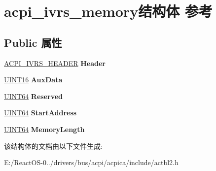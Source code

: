 \hypertarget{structacpi__ivrs__memory}{}\section{acpi\+\_\+ivrs\+\_\+memory结构体 参考}
\label{structacpi__ivrs__memory}
\subsection*{Public 属性}
\begin{DoxyCompactItemize}
\item 
\mbox{\label{structacpi__ivrs__memory_a1b237dfb0f6ebf34c266b7c51ddc71aa}} 
\hyperlink{structacpi__ivrs__header}{A\+C\+P\+I\+\_\+\+I\+V\+R\+S\+\_\+\+H\+E\+A\+D\+ER} {\bfseries Header}
\item 
\mbox{\label{structacpi__ivrs__memory_a574abda63edb2ae0896671077fc78d57}} 
\hyperlink{_processor_bind_8h_a09f1a1fb2293e33483cc8d44aefb1eb1}{U\+I\+N\+T16} {\bfseries Aux\+Data}
\item 
\mbox{\label{structacpi__ivrs__memory_a00f581d1b731ad64c4447fd057e21853}} 
\hyperlink{_processor_bind_8h_a57be03562867144161c1bfee95ca8f7c}{U\+I\+N\+T64} {\bfseries Reserved}
\item 
\mbox{\label{structacpi__ivrs__memory_afbbe30fa1b9c3d006d55169e52d98661}} 
\hyperlink{_processor_bind_8h_a57be03562867144161c1bfee95ca8f7c}{U\+I\+N\+T64} {\bfseries Start\+Address}
\item 
\mbox{\label{structacpi__ivrs__memory_a49da5b8a8e8f8200b436195c1d0fc924}} 
\hyperlink{_processor_bind_8h_a57be03562867144161c1bfee95ca8f7c}{U\+I\+N\+T64} {\bfseries Memory\+Length}
\end{DoxyCompactItemize}


该结构体的文档由以下文件生成\+:\begin{DoxyCompactItemize}
\item 
E\+:/\+React\+O\+S-\/0../drivers/bus/acpi/acpica/include/actbl2.\+h\end{DoxyCompactItemize}
